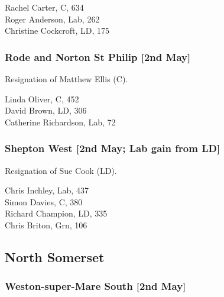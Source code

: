 \documentclass[a4paper,openany,10pt]{book}
\begin{document}
Rachel Carter, C, 634\\
Roger Anderson, Lab, 262\\
Christine Cockcroft, LD, 175\\


\subsubsection*{Rode and Norton St Philip \hspace*{\fill}\nolinebreak[1]%
\enspace\hspace*{\fill}
[2nd May]}


Resignation of Matthew Ellis (C).



Linda Oliver, C, 452\\
David Brown, LD, 306\\
Catherine Richardson, Lab, 72\\


\subsubsection*{Shepton West \hspace*{\fill}\nolinebreak[1]%
\enspace\hspace*{\fill}
[2nd May; Lab gain from LD]}


Resignation of Sue Cook (LD).



Chris Inchley, Lab, 437\\
Simon Davies, C, 380\\
Richard Champion, LD, 335\\
Chris Briton, Grn, 106\\


\subsection*{North Somerset}

\subsubsection*{Weston-super-Mare South \hspace*{\fill}\nolinebreak[1]%
\enspace\hspace*{\fill}
[2nd May]}
\end{document}
